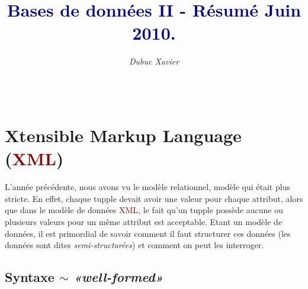 \documentclass{article}
\title{\textbf{\textcolor{darkblue}{Bases de données II - Résumé Juin 2010.}}}
\author{\textit{Dubuc Xavier}}
\newcommand{\red}[1]{\textcolor{darkred}{#1}}
\begin{document}
\maketitle

\hbox{\raisebox{0.4em}{\vrule depth 0.4pt height 0.4pt width 10cm}}

\tableofcontents

$ $ \\
\hbox{\raisebox{0.4em}{\vrule depth 0.4pt height 0.4pt width 10cm}}

\newpage

\section{Xtensible Markup Language (\red{XML})}

L'année précédente, nous avons vu le modèle relationnel, modèle qui était plus stricte. En effet, chaque tupple devait avoir une valeur pour chaque attribut, alors que dans le modèle 
de données \red{XML}, le fait qu'un tupple possède aucune ou plusieurs valeurs pour un même attribut est acceptable. Etant un modèle de données, il est primordial de savoir 
comment il faut structurer ces données (les données sont dites \textit{semi-structurées}) et comment on peut les interroger.

\subsection{Syntaxe $\sim$ \textit{«well-formed»}}
\end{document}
